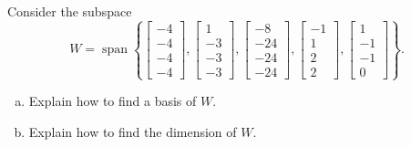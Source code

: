 
\begin{exerciseStatement}


Consider the subspace \[W=\operatorname{span}  \left\{ \left[\begin{array}{c}
-4 \\
-4 \\
-4 \\
-4
\end{array}\right] , \left[\begin{array}{c}
1 \\
-3 \\
-3 \\
-3
\end{array}\right] , \left[\begin{array}{c}
-8 \\
-24 \\
-24 \\
-24
\end{array}\right] , \left[\begin{array}{c}
-1 \\
1 \\
2 \\
2
\end{array}\right] , \left[\begin{array}{c}
1 \\
-1 \\
-1 \\
0
\end{array}\right] \right\} .\]


\begin{enumerate}[(a)]
\item  Explain how to find a basis of \(W\).
\item  Explain how to find the dimension of \(W\).
\end{enumerate}
    
\end{exerciseStatement}
    
